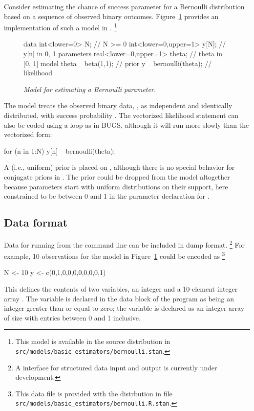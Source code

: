 \documentclass[article]{jss}
\begin{document}
Consider estimating the chance of success parameter for a Bernoulli
distribution based on a sequence of observed binary outcomes.  
Figure~\ref{bernoulli-model.fig} provides an implementation of such a
model in .%
%
\footnote{This model is available in the  source
  distribution in \nolinkurl{src/models/basic\_estimators/bernoulli.stan}.}
%
\begin{figure}
\begin{Code}
data {
  int<lower=0> N;                  // N >= 0
  int<lower=0,upper=1> y[N];       // y[n] in { 0, 1 }
}
parameters {
  real<lower=0,upper=1> theta;     // theta in [0, 1]
}
model {
  theta ~ beta(1,1);               // prior
  y ~ bernoulli(theta);            // likelihood
}
\end{Code}
\caption{\it Model for estimating a Bernoulli parameter.}\label{bernoulli-model.fig}
\end{figure}
%
The model treats the observed binary data, , as
independent and identically distributed, with success probability
.  The vectorized likelihood statement can also be coded
using a loop as in BUGS, although it will run more slowly than the
vectorized form:
%
\begin{Code}
for (n in 1:N)
  y[n] ~ bernoulli(theta);
\end{Code}
%
A  (i.e., uniform) prior is placed on ,
although there is no special behavior for conjugate priors in
.  The prior could be dropped from the model altogether
because parameters start with uniform distributions on their support,
here constrained to be between 0 and 1 in the parameter declaration
for .  



\subsection{Data format}

Data for running  from the command line can be included
in  dump format.%
%
\footnote{A  interface for structured data input and output is
  currently under development.}
%
For example, 10 observations for the
model in Figure~\ref{bernoulli-model.fig} could be encoded as%
%
\footnote{This data
file is provided with the  distrbution in file
\nolinkurl{src/models/basic\_estimators/bernoulli.R.stan}.}
%
\begin{Code}
N <- 10
y <- c(0,1,0,0,0,0,0,0,0,1)
\end{Code}
%
This defines the contents of two variables, an integer  and a
10-element integer array .  The variable  is declared
in the data block of the program as being an integer greater than or
equal to zero;  the variable  is declared as an integer array of size
 with entries between 0 and 1 inclusive.
\end{document}
